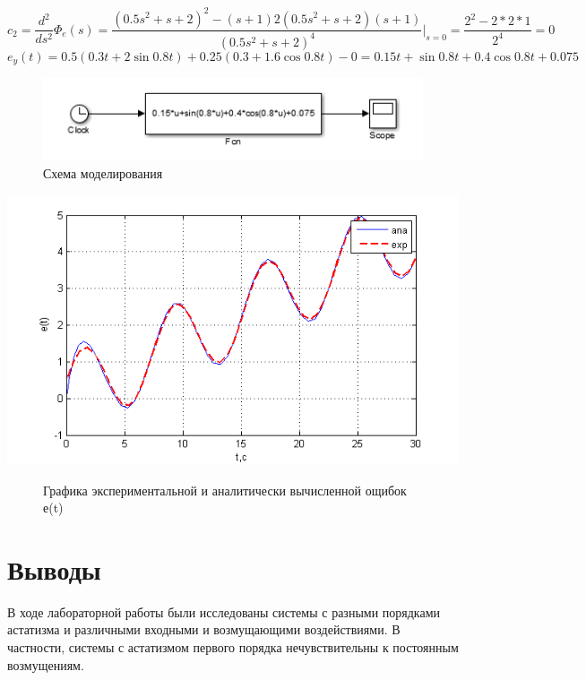 \documentclass[a4paper, 11pt]{article}
\begin{document}
\[{c_2} = \frac{{{d^2}}}{{d{s^2}}}{\Phi _e}(s) = \frac{{{{(0.5{s^2} + s + 2)}^2} - (s + 1)2(0.5{s^2} + s + 2)(s + 1)}}{{{{(0.5{s^2} + s + 2)}^4}}}{|_{s = 0}} = \frac{{{2^2} - 2*2*1}}{{{2^4}}} = 0\]
\[{e_y}(t) = 0.5(0.3t + 2\sin 0.8t) + 0.25(0.3 + 1.6\cos 0.8t) - 0 = 0.15t + \sin 0.8t + 0.4\cos 0.8t + 0.075\]

\begin{figure}[h]
	\centering
	\includegraphics[width=0.7\linewidth]{16}
	\caption{Схема моделирования}
	\label{fig:16}
\end{figure}

\begin{center}
	\includegraphics[width=0.7\linewidth]{17}
	\begin{figure}[ht]
		\centering
		
		\caption{Графика экспериментальной и аналитически вычисленной ощибок е(t)}
		\label{fig:17}
	\end{figure}
\end{center}

\section*{Выводы}
В ходе лабораторной работы были исследованы системы с разными порядками астатизма и различными входными и возмущающими воздействиями. В частности, системы с астатизмом первого порядка нечувствительны к постоянным возмущениям.
\end{document}

